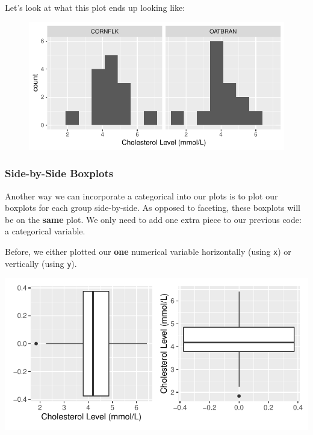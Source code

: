 \documentclass[
  letterpaper,
  DIV=11,
  numbers=noendperiod]{scrartcl}
\begin{document}
Let's look at what this plot ends up looking like:

\begin{figure}

{\centering \includegraphics{activity5-cholesterol-I-key_files/figure-pdf/facet-hist-1.pdf}

}

\end{figure}

\hypertarget{side-by-side-boxplots}{%
\subsubsection{Side-by-Side Boxplots}\label{side-by-side-boxplots}}

Another way we can incorporate a categorical into our plots is to plot
our boxplots for each group side-by-side. As opposed to faceting, these
boxplots will be on the \textbf{same} plot. We only need to add one
extra piece to our previous code: a categorical variable.

Before, we either plotted our \textbf{one} numerical variable
horizontally (using \texttt{x}) or vertically (using \texttt{y}).

\includegraphics{activity5-cholesterol-I-key_files/figure-pdf/one-box-1.pdf}
\end{document}

